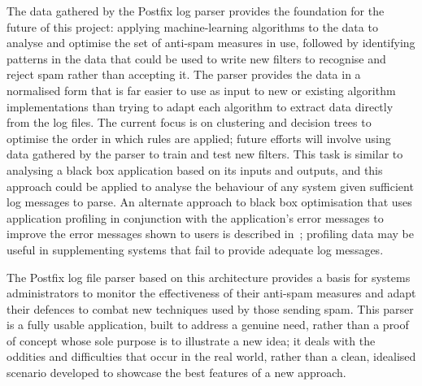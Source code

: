 \documentclass{svmult}
\begin{document}
The data gathered by the Postfix log parser provides the foundation for the
future of this project: applying machine-learning algorithms to the data to
analyse and optimise the set of anti-spam measures in use, followed by
identifying patterns in the data that could be used to write new filters to
recognise and reject spam rather than accepting it.  The parser provides
the data in a normalised form that is far easier to use as input to new or
existing algorithm implementations than trying to adapt each algorithm to
extract data directly from the log files.  The current focus is on
clustering and decision trees to optimise the order in which rules are
applied; future efforts will involve using data gathered by the parser to
train and test new filters.  This task is similar to analysing a black
box application based on its inputs and outputs, and this approach could be
applied to analyse the behaviour of any system given sufficient log
messages to parse.  An alternate approach to black box optimisation that
uses application profiling in conjunction with the application's error
messages to improve the error messages shown to users is described
in~\cite{black-box-error-reporting}; profiling data may be useful in
supplementing systems that fail to provide adequate log messages.

The Postfix log file parser based on this architecture provides a basis for
systems administrators to monitor the effectiveness of their anti-spam
measures and adapt their defences to combat new techniques used by those
sending spam.  This parser is a fully usable application, built to address
a genuine need, rather than a proof of concept whose sole purpose is to
illustrate a new idea; it deals with the oddities and difficulties that
occur in the real world, rather than a clean, idealised scenario developed
to showcase the best features of a new approach.



\end{document}
